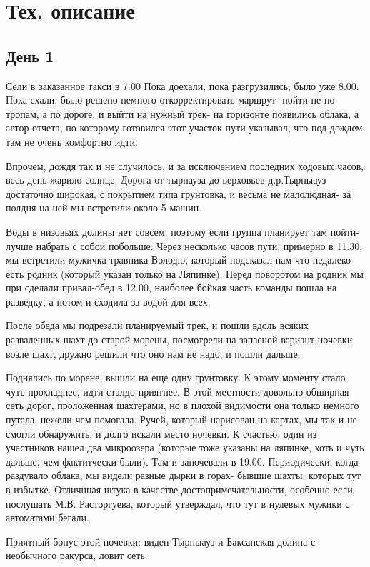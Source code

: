 \documentclass[]{article}
\newcommand{\tyr}{Тырныауз }
\begin{document}
	
\section{Тех. описание}	
\subsection{День 1}
Сели в заказанное такси в 7.00
Пока доехали, пока разгрузились, было уже 8.00. Пока ехали, было решено немного откорректировать маршрут- пойти не по тропам, а по дороге, и выйти на нужный трек- на горизонте появились облака, а автор отчета, по которому готовился этот участок пути указывал, что под дождем там не очень комфортно идти.

Впрочем, дождя так и не случилось, и за исключением последних ходовых часов, весь день жарило солнце. 
Дорога от тырнауза до верховьев д.р.Тырныауз достаточно широкая, с покрытием типа грунтовка, и весьма не малолюдная- за полдня на ней мы встретили около 5 машин.

Воды в низовьях долины нет совсем, поэтому если группа планирует там пойти- лучше набрать с собой побольше. Через несколько часов пути, примерно в 11.30, мы встретили мужичка травника Володю, который подсказал нам что недалеко есть родник (который указан только на Ляпинке). Перед поворотом на родник мы при сделали привал-обед в 12.00, наиболее бойкая часть команды пошла на разведку, а потом и сходила за водой для всех. 

После обеда мы подрезали планируемый трек, и пошли вдоль всяких разваленных шахт до старой морены, посмотрели на запасной вариант ночевки возле шахт, дружно решили что оно нам не надо, и пошли дальше.

Поднялись по морене, вышли на еще одну грунтовку.
К этому моменту стало чуть прохладнее, идти сталдо приятнее. В этой местности довольно обширная сеть дорог, проложенная шахтерами, но в плохой видимости она только немного путала, нежели чем помогала.
Ручей, который нарисован на картах, мы так и не смогли обнаружить, и долго искали место ночевки. К счастью, один из участников нашел два микроозера (которые тоже указаны на ляпинке, хоть и чуть дальше, чем фактитчески были). Там и заночевали в 19.00. Периодически, когда раздувало облака, мы видели разные дырки в горах- бывшие шахты. которых тут в избытке. Отличнная штука в качестве достопримечательности, особенно если послушать М.В. Расторгуева, который утверждал, что тут в нулевых мужики с автоматами бегали. 

Приятный бонус этой ночевки: виден \tyr и Баксанская долина с необычного ракурса, ловит сеть.
\end{document}
